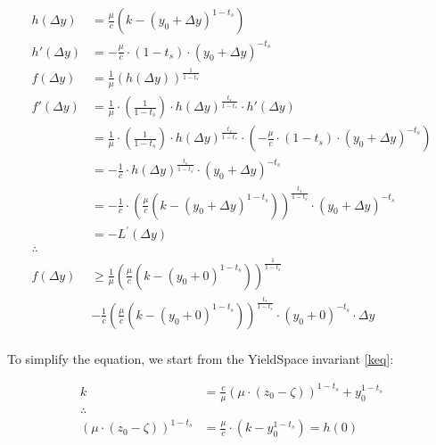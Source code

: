 \begin{equation}
\begin{aligned}
    h(\Delta y) &= \frac{\mu}{c} \left( k - \left( y_0 + \Delta y \right)^{1 - t_s} \right) \\
    h'(\Delta y) &= - \frac{\mu}{c} \cdot (1 - t_s) \cdot (y_0 + \Delta y)^{-t_s} \\
    f(\Delta y) &= \frac{1}{\mu} \left( h(\Delta y) \right)^{\frac{1}{1-t_s}} \\
    f'(\Delta y) &= \frac{1}{\mu} \cdot \left( \frac{1}{1 - t_s} \right) \cdot h(\Delta y)^{\frac{t_s}{1 - t_s}} \cdot h'(\Delta y) \\
    &= \frac{1}{\mu} \cdot \left( \frac{1}{1 - t_s} \right) \cdot h(\Delta y)^{\frac{t_s}{1 - t_s}} \cdot \left( - \frac{\mu}{c} \cdot \left( 1 - t_s \right) \cdot \left( y_0 + \Delta y \right)^{-t_s} \right) \\
    &= - \frac{1}{c} \cdot h(\Delta y)^{\frac{t_s}{1 - t_s}} \cdot \left( y_0 + \Delta y \right)^{-t_s} \\
    &= - \frac{1}{c} \cdot \left( \frac{\mu}{c} \left( k - \left( y_0 + \Delta y \right)^{1 - t_s} \right) \right)^{\frac{t_s}{1 - t_s}} \cdot \left( y_0 + \Delta y \right)^{-t_s} \\
    &= -L^{\prime}(\Delta y) \\
    \therefore \\
    f(\Delta y) &\ge \frac{1}{\mu} \left( \frac{\mu}{c} \left( k - (y_0 + 0)^{1-t_s} \right) \right)^{\frac{1}{1 - t_s}} \\
    &- \frac{1}{c} \left( \frac{\mu}{c} \left( k - (y_0 + 0)^{1 - t_s} \right) \right)^{\frac{t_s}{1 - t_s}} \cdot (y_0 + 0)^{-t_s} \cdot \Delta y \\
\end{aligned}
\end{equation}

To simplify the equation, we start from the YieldSpace invariant \eqref{keq}:

\begin{equation}\label{alt-h0}
\begin{aligned}
    k &= \tfrac{c}{\mu} \left( \mu \cdot \left( z_0 - \zeta \right) \right)^{1 - t_{s}} + y_0^{1 - t_{s}} \\
    \therefore \\
    \left( \mu \cdot \left( z_0 - \zeta \right) \right)^{1 - t_s} &= \frac{\mu}{c} \cdot \left( k - y_0^{1-t_s} \right) = h(0)
\end{aligned}
\end{equation}

